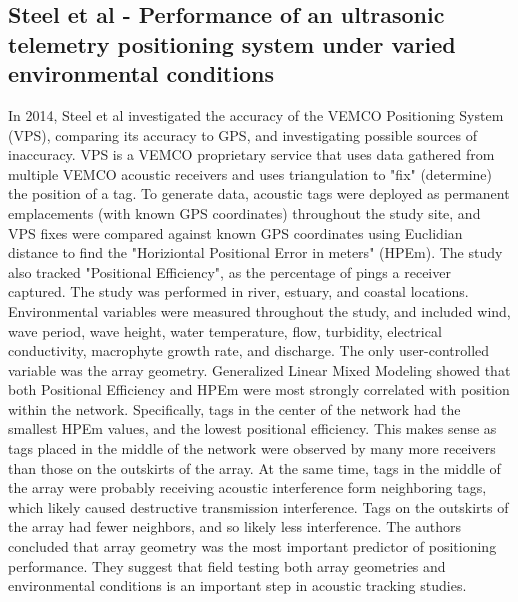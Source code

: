 \subsection {Steel et al - Performance of an ultrasonic telemetry positioning system under varied environmental conditions}
In 2014, Steel et al\cite{Steel2014} investigated the accuracy of the VEMCO Positioning System (VPS), comparing its accuracy to GPS, and investigating possible sources of inaccuracy.  VPS is a VEMCO proprietary service that uses data gathered from multiple VEMCO acoustic receivers and uses triangulation to "fix" (determine) the position of a tag.  To generate data, acoustic tags were deployed as permanent emplacements (with known GPS coordinates) throughout the study site, and VPS fixes were compared against known GPS coordinates using Euclidian distance to find the "Horiziontal Positional Error in meters" (HPEm).  The study also tracked "Positional Efficiency", as the percentage of pings a receiver captured.  The study was performed in river, estuary, and coastal locations.  Environmental variables were measured throughout the study, and included wind, wave period, wave height, water temperature, flow, turbidity, electrical conductivity, macrophyte growth rate, and discharge.  The only user-controlled variable was the array geometry.  Generalized Linear Mixed Modeling showed that both Positional Efficiency and HPEm were most strongly correlated with position within the network.  Specifically, tags in the center of the network had the smallest HPEm values, and the lowest positional efficiency.  This makes sense as tags placed in the middle of the network were observed by many more receivers than those on the outskirts of the array.  At the same time, tags in the middle of the array were probably receiving acoustic interference form neighboring tags, which likely caused destructive transmission interference.  Tags on the outskirts of the array had fewer neighbors, and so likely less interference.  The authors concluded that array geometry was the most important predictor of positioning performance. They suggest that field testing both array geometries and environmental conditions is an important step in acoustic tracking studies.



